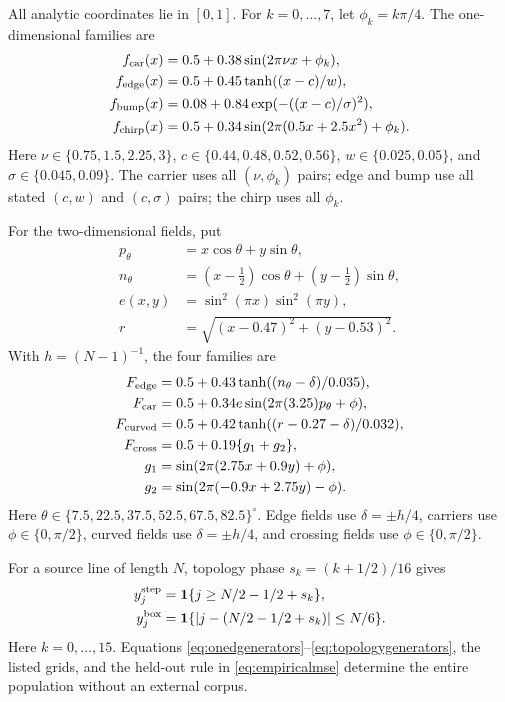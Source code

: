 All analytic coordinates lie in \([0,1]\). For \(k=0,\ldots,7\), let
\(\phi_k=k\pi/4\). The one-dimensional families are
\begin{align}
 f_{\rm car}(x)&=0.5+0.38\sin(2\pi\nu x+\phi_k),\nonumber\\
 f_{\rm edge}(x)&=0.5+0.45\tanh((x-c)/w),\nonumber\\
 f_{\rm bump}(x)&=0.08+0.84\exp(-((x-c)/\sigma)^2),\nonumber\\
 f_{\rm chirp}(x)&=0.5+0.34\sin(2\pi(0.5x+2.5x^2)+\phi_k).
 \label{eq:onedgenerators}
\end{align}
Here \(\nu\in\{0.75,1.5,2.25,3\}\),
\(c\in\{0.44,0.48,0.52,0.56\}\),
\(w\in\{0.025,0.05\}\), and
\(\sigma\in\{0.045,0.09\}\). The carrier uses all \((\nu,\phi_k)\)
pairs; edge and bump use all stated \((c,w)\) and \((c,\sigma)\) pairs;
the chirp uses all \(\phi_k\).

For the two-dimensional fields, put
\begin{align}
 p_\theta&=x\cos\theta+y\sin\theta,\nonumber\\
 n_\theta&=(x-\tfrac12)\cos\theta+(y-\tfrac12)\sin\theta,\nonumber\\
 e(x,y)&=\sin^2(\pi x)\sin^2(\pi y),\nonumber\\
 r&=\sqrt{(x-0.47)^2+(y-0.53)^2}.
\end{align}
With \(h=(N-1)^{-1}\), the four families are
\begin{align}
 F_{\rm edge}&=0.5+0.43\tanh((n_\theta-\delta)/0.035),\nonumber\\
 F_{\rm car}&=0.5+0.34e\sin(2\pi(3.25)p_\theta+\phi),\nonumber\\
 F_{\rm curved}&=0.5+0.42\tanh((r-0.27-\delta)/0.032),\nonumber\\
 F_{\rm cross}&=0.5+0.19\{g_1+g_2\},\nonumber\\
 g_1&=\sin(2\pi(2.75x+0.9y)+\phi),\nonumber\\
 g_2&=\sin(2\pi(-0.9x+2.75y)-\phi).
 \label{eq:twodgenerators}
\end{align}
Here
\(\theta\in\{7.5,22.5,37.5,52.5,67.5,82.5\}^{\circ}\). Edge fields
use \(\delta=\pm h/4\), carriers use \(\phi\in\{0,\pi/2\}\), curved
fields use \(\delta=\pm h/4\), and crossing fields use
\(\phi\in\{0,\pi/2\}\).

For a source line of length \(N\), topology phase
\(s_k=(k+1/2)/16\) gives
\begin{align}
 y_j^{\rm step}&=\mathbf 1\{j\geq N/2-1/2+s_k\},\nonumber\\
 y_j^{\rm box}&=\mathbf 1\{|j-(N/2-1/2+s_k)|\leq N/6\}.
 \label{eq:topologygenerators}
\end{align}
Here \(k=0,\ldots,15\).
Equations \eqref{eq:onedgenerators}--\eqref{eq:topologygenerators}, the
listed grids, and the held-out rule in \eqref{eq:empiricalmse} determine the
entire population without an external corpus.

